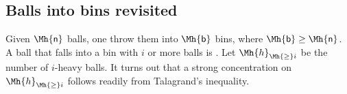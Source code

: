 \newcommand{\nballs}{\Mh{\mathsf{n}}}%
\newcommand{\nbins}{\Mh{\mathsf{b}}}%
\newcommand{\NHX}[1]{\Mh{h}_{\Mh{\geq} #1}}


\subsection{Balls into bins revisited}

Given $\nballs$ balls, one throw them into $\nbins$ bins, where
$\nbins \geq \nballs$.  A ball that falls into a bin with $i$ or more
balls is .  Let $\NHX{i}$ be the number of $i$-heavy
balls. It turns out that a strong concentration on $\NHX{i}$ follows
readily from Talagrand's inequality.



